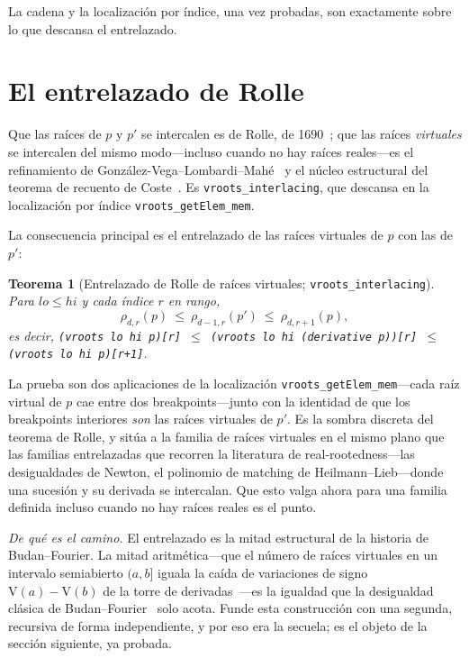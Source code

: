 \documentclass[11pt]{article}
\newtheorem{theorem}{Teorema}
\newcommand{\lean}[1]{\texttt{#1}}
\newcommand{\V}{\mathrm{V}}
\begin{document}
La cadena y la localizaci\'on por \'indice, una vez probadas, son exactamente sobre lo que descansa el
entrelazado.

\section{El entrelazado de Rolle}\label{sec:q4}

Que las ra\'ices de $p$ y $p'$ se intercalen es de Rolle, de 1690~\cite{rolle}; que las
ra\'ices \emph{virtuales} se intercalen del mismo modo---incluso cuando no hay ra\'ices reales---es el
refinamiento de Gonz\'alez-Vega--Lombardi--Mah\'e~\cite{glm} y el n\'ucleo estructural del teorema de
recuento de Coste~\cite{coste}. Es \lean{vroots\_interlacing}, que descansa en la localizaci\'on por
\'indice \lean{vroots\_getElem\_mem}.

La consecuencia principal es el entrelazado de las ra\'ices virtuales
de $p$ con las de $p'$:
\begin{theorem}[Entrelazado de Rolle de ra\'ices virtuales; \lean{vroots\_interlacing}]\label{thm:interlace}
Para $lo\le hi$ y cada \'indice $r$ en rango,
\[
  \rho_{d,r}(p)\ \le\ \rho_{d-1,r}(p')\ \le\ \rho_{d,r+1}(p),
\]
es decir, \lean{(vroots lo hi p)[r] $\le$ (vroots lo hi (derivative p))[r] $\le$ (vroots lo hi p)[r+1]}.
\end{theorem}
\noindent La prueba son dos aplicaciones de la localizaci\'on \lean{vroots\_getElem\_mem}---cada
ra\'iz virtual de $p$ cae entre dos breakpoints---junto con la identidad de que los breakpoints
interiores \emph{son} las ra\'ices virtuales de $p'$. Es la sombra discreta del teorema de Rolle, y
sit\'ua a la familia de ra\'ices virtuales en el mismo plano que las familias entrelazadas que
recorren la literatura de real-rootedness---las desigualdades de Newton, el polinomio de matching de
Heilmann--Lieb---donde una sucesi\'on y su derivada se intercalan. Que esto valga ahora para una
familia definida incluso cuando no hay ra\'ices reales es el punto.

\emph{De qu\'e es el camino.} El entrelazado es la mitad estructural de la historia de Budan--Fourier.
La mitad aritm\'etica---que el n\'umero de ra\'ices virtuales en un intervalo semiabierto $(a,b]$
iguala la ca\'ida de variaciones de signo $\V(a)-\V(b)$ de la torre de derivadas~\cite{coste}---es la
igualdad que la desigualdad cl\'asica de Budan--Fourier~\cite{bflean} solo acota. Funde esta
construcci\'on con una segunda, recursiva de forma independiente, y por eso era la secuela; es el
objeto de la secci\'on siguiente, ya probada.
\end{document}
